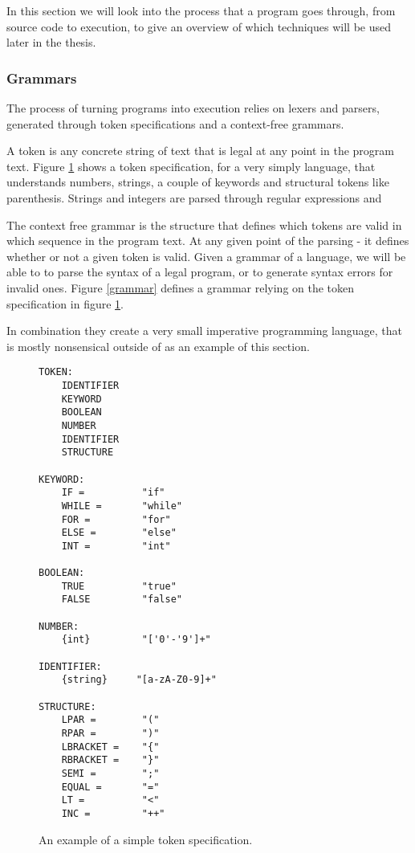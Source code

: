 \documentclass[11pt]{article}
\begin{document}
In this section we will look into the process that a program goes through, from source code to execution, to give an overview of which techniques will be used later in the thesis.

\subsubsection{Grammars}
The process of turning programs into execution relies on lexers and parsers, generated through token specifications and a context-free grammars.

A token is any concrete string of text that is legal at any point in the program text. Figure \ref{token} shows a token specification, for a very simply language, that understands numbers, strings, a couple of keywords and structural tokens like parenthesis. Strings and integers are parsed through regular expressions and 

The context free grammar is the structure that defines which tokens are valid in which sequence in the program text. At any given point of the parsing - it defines whether or not a given token is valid. Given a grammar of a language, we will be able to to parse the syntax of a legal program, or to generate syntax errors for invalid ones. Figure \ref{grammar} defines a grammar relying on the token specification in figure \ref{token}.

In combination they create a very small imperative programming language, that is mostly nonsensical outside of as an example of this section.

\begin{figure}
  \caption{An example of a simple token specification.}
  \label{token}
\begin{verbatim}
TOKEN:
    IDENTIFIER
    KEYWORD
    BOOLEAN
    NUMBER
    IDENTIFIER
    STRUCTURE
    
KEYWORD:
    IF =          "if"
    WHILE =       "while"
    FOR =         "for"
    ELSE =        "else"
    INT =         "int"
    
BOOLEAN:
    TRUE          "true"
    FALSE         "false"

NUMBER:
    {int}         "['0'-'9']+"
	
IDENTIFIER:
    {string}     "[a-zA-Z0-9]+"
    
STRUCTURE:
    LPAR =        "("
    RPAR =        ")"
    LBRACKET =    "{"
    RBRACKET =    "}"
    SEMI =        ";"
    EQUAL =       "="
    LT =          "<"
    INC =         "++"

\end{verbatim}
\end{figure}
\end{document}

